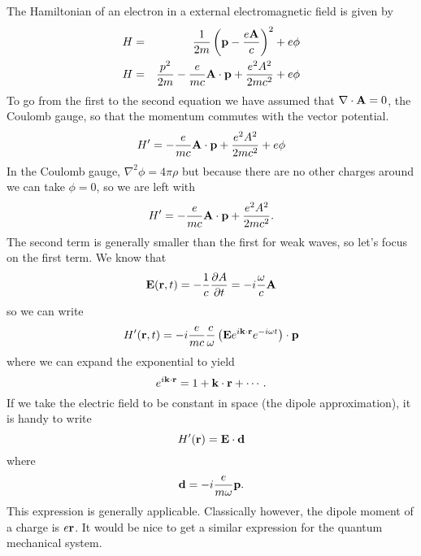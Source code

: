 The Hamiltonian of an electron in a external electromagnetic field
is given by
\begin{eqnarray}
H &=& \frac{1}{2m} \left ( {\bf p} - \frac{e{\bf A}}{c} \right )^2 +
e\phi \\
H &=& \frac{p^2}{2m} - \frac{e}{mc} {\bf A} \cdot {\bf p} + \frac{e^2
  A^2}{2mc^2} + e\phi
\label{eq:509}
\end{eqnarray}
To go from the first to the second equation we have assumed that
$\nabla \cdot {\bf A}=0$, the Coulomb gauge, so that the momentum
commutes with the vector potential.
\begin{equation}
H' =  - \frac{e}{mc} {\bf A} \cdot {\bf p} + \frac{e^2 A^2}{2mc^2} 
+ e\phi
\label{eq:510}
\end{equation}
In the Coulomb gauge, $\nabla^2 \phi = 4\pi \rho$ but because there
are no other charges around we can take $\phi=0$, so we are left with
\begin{equation}
H' =  - \frac{e}{mc} {\bf A} \cdot {\bf p} + \frac{e^2 A^2}{2mc^2} .
\label{eq:511}
\end{equation}
The second term is generally smaller than the first for weak waves, so
let's focus on the first term.  We know that
\begin{equation}
{\bf E}({\bf r}, t) = -\frac{1}{c} \frac{\partial {A}}{\partial {t}} = -i \frac{\omega}{c} {\bf A}
\label{eq:512}
\end{equation}
so we can write
\begin{equation}
H'({\bf r},t) =  -i \frac{e}{mc} \frac{c}{\omega} \left ( {\bf E}  e^{i{\bf k}\cdot{\bf
    r}} e^{-i\omega t} \right ) \cdot {\bf p}
\label{eq:513}
\end{equation}
where we can expand the exponential to yield
\begin{equation}
e^{i{\bf k}\cdot {\bf r}} = 1 + {\bf k}\cdot {\bf r} + \cdots.
\label{eq:516}
\end{equation}
If we take the electric field to be constant in space (the dipole
approximation), it is handy to write 
\begin{equation}
H'({\bf r}) = {\bf E} \cdot {\bf d}
\label{eq:514}
\end{equation}
where
\begin{equation}
{\bf d} = -i \frac{e}{m\omega} {\bf p} .
\label{eq:515}
\end{equation}
This expression is generally applicable.  Classically however, the
dipole moment of a charge is $e{\bf r}$.  It would be nice to get a
similar expression for the quantum mechanical system.

